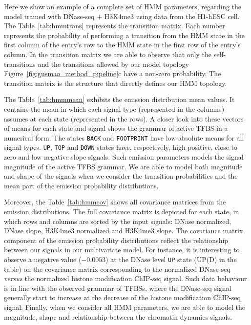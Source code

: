 Here we show an example of a complete set of HMM parameters, regarding the model trained with DNase-seq $+$ H3K4me3 using data from the H1-hESC cell. The Table~\ref{tab:hmmtrans} represents the transition matrix. Each number represents the probability of performing a transition from the HMM state in the first column of the entry's row to the HMM state in the first row of the entry's column. In the transition matrix we are able to observe that only the self-transitions and the transitions allowed by our model topology Figure~\ref{fig:gusmao_method_pipeline}c have a non-zero probability. The transition matrix is the structure that directly defines our HMM topology.

The Table~\ref{tab:hmmmean} exhibits the emission distribution mean values. It contains the mean in which each signal type (represented in the columns) assumes at each state (represented in the rows). A closer look into these vectors of means for each state and signal shows the grammar of active TFBS in a numerical form. The states {\tt BACK} and {\tt FOOTPRINT} have low absolute means for all signal types. {\tt UP}, {\tt TOP} and {\tt DOWN} states have, respectively, high positive, close to zero and low negative slope signals. Such emission parameters models the signal magnitude of the active TFBS grammar. We are able to model both magnitude and shape of the signals when we consider the transition probabilities and the mean part of the emission probability distributions.

Moreover, the Table~\ref{tab:hmmcov} shows all covariance matrices from the emission distributions. The full covariance matrix is depicted for each state, in which rows and columns are sorted by the input signals: DNase normalized, DNase slope, H3K4me3 normalized and H3K4me3 slope. The covariance matrix component of the emission probability distributions reflect the relationship between our signals in our multivariate model. For instance, it is interesting to observe a negative value ($-0.0053$) at the DNase level {\tt UP} state (UP(D) in the table) on the covariance matrix corresponding to the normalized DNase-seq \emph{versus} the normalized histone modification ChIP-seq signal. Such data behaviour is in line with the observed grammar of TFBSs, where the DNase-seq signal generally start to increase at the decrease of the histone modification ChIP-seq signal. Finally, when we consider all HMM parameters, we are able to model the magnitude, shape and relationship between the chromatin dynamics signals.

